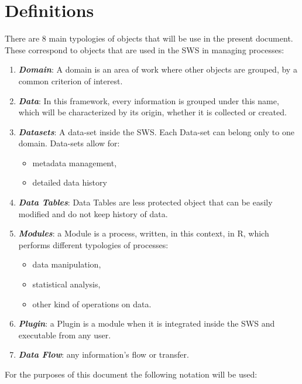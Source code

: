\documentclass[]{article}
\providecommand{\tightlist}{%
  \setlength{\itemsep}{0pt}\setlength{\parskip}{0pt}}
\begin{document}
\section*{Definitions}\label{definitions}

There are 8 main typologies of objects that will be use in the present
document. These correspond to objects that are used in the SWS in
managing processes:

\begin{enumerate}
\def\labelenumi{\arabic{enumi}.}
\tightlist
\item
  \textbf{\emph{Domain}}: A domain is an area of work where other
  objects are grouped, by a common criterion of interest.
\item
  \textbf{\emph{Data}}: In this framework, every information is grouped
  under this name, which will be characterized by its origin, whether it
  is collected or created.
\item
  \textbf{\emph{Datasets}}: A data-set inside the SWS. Each Data-set can
  belong only to one domain. Data-sets allow for:

  \begin{itemize}
  \tightlist
  \item
    metadata management,
  \item
    detailed data history
  \end{itemize}
\item
  \textbf{\emph{Data Tables}}: Data Tables are less protected object
  that can be easily modified and do not keep history of data.
\item
  \textbf{\emph{Modules}}: a Module is a process, written, in this
  context, in R, which performs different typologies of processes:

  \begin{itemize}
  \tightlist
  \item
    data manipulation,
  \item
    statistical analysis,
  \item
    other kind of operations on data.
  \end{itemize}
\item
  \textbf{\emph{Plugin}}: a Plugin is a module when it is integrated
  inside the SWS and executable from any user.
\item
  \textbf{\emph{Data Flow}}: any information's flow or transfer.
\end{enumerate}

For the purposes of this document the following notation will be used:
\end{document}

